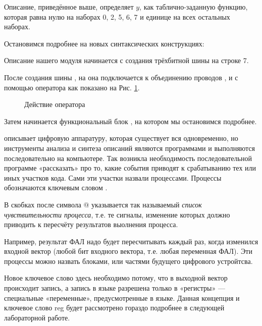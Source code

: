 

\par{Описание, приведённое выше, определяет $y$, как таблично-заданную функцию, которая равна нулю на наборах 0, 2, 5, 6, 7 и единице на всех остальных наборах.}

\par{Остановимся подробнее на новых синтаксических конструкциях:}
\par{Описание нашего модуля начинается с создания трёхбитной шины  на строке 7.}
\par{После создания шины , на она подключается к объединению проводов ,  и  с помощью оператора  как показано на Рис. \ref{fig:assign}.}

\begin{figure}[H]
  \centering
  \def\svgwidth{\columnwidth}
  
  \caption{Действие оператора }
  \label{fig:assign}
\end{figure}

\par{Затем начинается функциональный блок , на котором мы остановимся подробнее.}
\par{ описывает цифровую аппаратуру, которая существует вся одновременно, но инструменты анализа и синтеза описаний являются программами и выполняются последовательно на компьютере. Так возникла необходимость последовательной программе «рассказать» про то, какие события приводят к срабатыванию тех или иных участков кода. Сами эти участки назвали процессами. Процессы обозначаются ключевым словом .}

\par{В скобках после символа @ указывается так называемый \emph{список чувствительности процесса}, т.е. те сигналы, изменение которых должно приводить к пересчёту результатов выолнения процесса.}

\par{Например, результат ФАЛ надо будет пересчитывать каждый раз, когда изменился входной вектор (любой бит входного вектора, т.е. любая переменная ФАЛ). Эти процессы можно назвать блоками, или частями будущего цифрового устройтсва.}

\par{Новое ключевое слово  здесь необходимо потому, что в выходной вектор происходит запись, а запись в языке  разрешена только в «регистры» — специальные «переменные», предусмотренные в языке. Данная концепция и ключевое слово reg будет рассмотрено гораздо подробнее в следующей лабораторной работе.}

